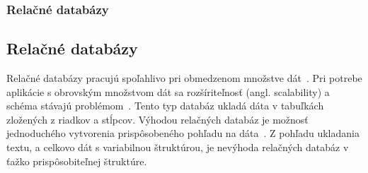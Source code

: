 %
%
{
	\subsubsection{Relačné databázy}
}
{
	\subsection{Relačné databázy}
}
\label{subsubsection:relation_dbs}
Relačné databázy pracujú spoľahlivo pri obmedzenom množstve dát~\cite{MongoDBvsMySQL2015}.
Pri potrebe aplikácie s obrovským množstvom dát sa rozšíriteľnosť (angl. scalability) a schéma stávajú problémom~\cite{NoSQLDBvsRealtionDB}.
Tento typ databáz ukladá dáta v tabuľkách zložených z riadkov a stĺpcov.
Výhodou relačných databáz je možnosť jednoduchého vytvorenia prispôsobeného pohľadu na dáta~\cite{Maier}. Z pohľadu ukladania textu, a celkovo dát s variabilnou štruktúrou, je nevýhoda relačných databáz v ťažko prispôsobiteľnej štruktúre.

